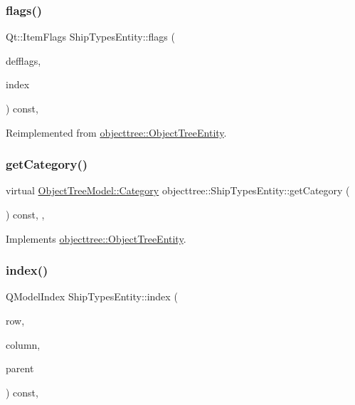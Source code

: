 \subsubsection{\texorpdfstring{flags()}{flags()}}
{\footnotesize\ttfamily Qt\+::\+Item\+Flags Ship\+Types\+Entity\+::flags (\begin{DoxyParamCaption}\item[{Qt\+::\+Item\+Flags}]{defflags,  }\item[{const Q\+Model\+Index \&}]{index }\end{DoxyParamCaption}) const\hspace{0.3cm}{\ttfamily [override]}, {\ttfamily [virtual]}}



Reimplemented from \mbox{\hyperlink{classobjecttree_1_1_object_tree_entity_a71042bfb5a8328bcbde9d283c0b1b28c}{objecttree\+::\+Object\+Tree\+Entity}}.

\mbox{\label{classobjecttree_1_1_ship_types_entity_a997458be788afdf00900aaca849825aa}} 
\subsubsection{\texorpdfstring{getCategory()}{getCategory()}}
{\footnotesize\ttfamily virtual \mbox{\hyperlink{class_object_tree_model_a379e9d6b0d381853785adf62095ba4e3}{Object\+Tree\+Model\+::\+Category}} objecttree\+::\+Ship\+Types\+Entity\+::get\+Category (\begin{DoxyParamCaption}{ }\end{DoxyParamCaption}) const\hspace{0.3cm}{\ttfamily [inline]}, {\ttfamily [override]}, {\ttfamily [virtual]}}



Implements \mbox{\hyperlink{classobjecttree_1_1_object_tree_entity_aa4e80e7fa80672c1b9902add665abc77}{objecttree\+::\+Object\+Tree\+Entity}}.

\mbox{\label{classobjecttree_1_1_ship_types_entity_a0ce8b95e0324fe6d91de55e71b4de5fa}} 
\subsubsection{\texorpdfstring{index()}{index()}}
{\footnotesize\ttfamily Q\+Model\+Index Ship\+Types\+Entity\+::index (\begin{DoxyParamCaption}\item[{int}]{row,  }\item[{int}]{column,  }\item[{const Q\+Model\+Index \&}]{parent }\end{DoxyParamCaption}) const\hspace{0.3cm}{\ttfamily [override]}, {\ttfamily [virtual]}}



